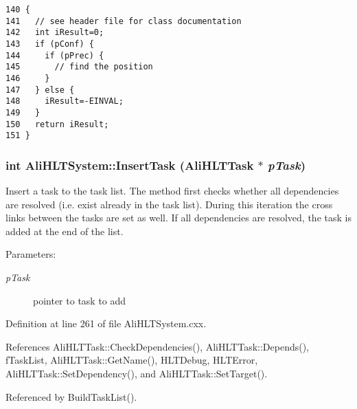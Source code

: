 \footnotesize\begin{verbatim}140 {
141   // see header file for class documentation
142   int iResult=0;
143   if (pConf) {
144     if (pPrec) {
145       // find the position
146     }
147   } else {
148     iResult=-EINVAL;
149   }
150   return iResult;
151 }
\end{verbatim}\normalsize 


\subsubsection{\setlength{\rightskip}{0pt plus 5cm}int Ali\-HLTSystem::Insert\-Task ({\bf Ali\-HLTTask} $\ast$ {\em p\-Task})}\label{classAliHLTSystem_a10}


Insert a task to the task list. The method first checks whether all dependencies are resolved (i.e. exist already in the task list). During this iteration the cross links between the tasks are set as well. If all dependencies are resolved, the task is added at the end of the list. \begin{Desc}
\item[Parameters:]
\begin{description}
\item[{\em p\-Task}]pointer to task to add \end{description}
\end{Desc}


Definition at line 261 of file Ali\-HLTSystem.cxx.

References Ali\-HLTTask::Check\-Dependencies(), Ali\-HLTTask::Depends(), f\-Task\-List, Ali\-HLTTask::Get\-Name(), HLTDebug, HLTError, Ali\-HLTTask::Set\-Dependency(), and Ali\-HLTTask::Set\-Target().

Referenced by Build\-Task\-List().

